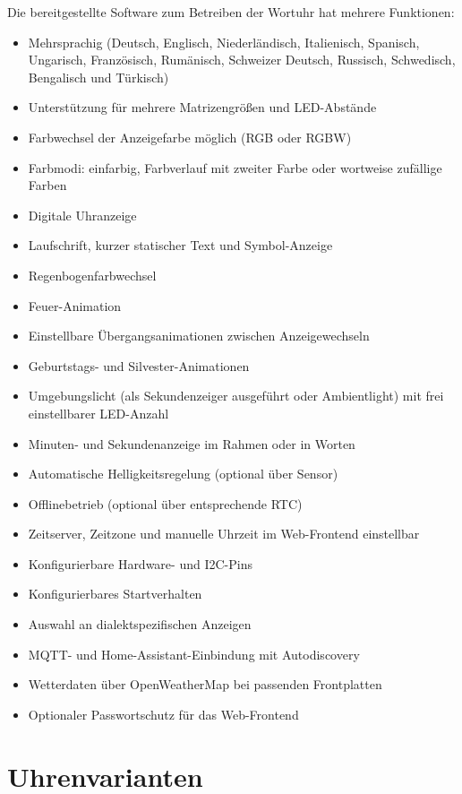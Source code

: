 \documentclass[12pt,a4paper, german,oneside, headinclude, headsepline,plainheadsepline,BCOR20mm, DIV18,parskip=half, openright, numbers=noenddot, captions=tableheading,version=first,listof=totoc,version=first]{scrbook}
\begin{document}
Die bereitgestellte Software zum Betreiben der Wortuhr hat mehrere Funktionen:

\begin{itemize}
    \item Mehrsprachig (Deutsch, Englisch, Niederländisch, Italienisch, Spanisch, Ungarisch, Französisch, Rumänisch, Schweizer Deutsch, Russisch, Schwedisch, Bengalisch und Türkisch)
    \item Unterstützung für mehrere Matrizengrößen und LED-Abstände
    \item Farbwechsel der Anzeigefarbe möglich (RGB oder RGBW)
    \item Farbmodi: einfarbig, Farbverlauf mit zweiter Farbe oder wortweise zufällige Farben
    \item Digitale Uhranzeige
    \item Laufschrift, kurzer statischer Text und Symbol-Anzeige
    \item Regenbogenfarbwechsel
    \item Feuer-Animation
    \item Einstellbare Übergangsanimationen zwischen Anzeigewechseln
    \item Geburtstags- und Silvester-Animationen
    \item Umgebungslicht (als Sekundenzeiger ausgeführt oder Ambientlight) mit frei einstellbarer LED-Anzahl
    \item Minuten- und Sekundenanzeige im Rahmen oder in Worten
    \item Automatische Helligkeitsregelung (optional über Sensor)
    \item Offlinebetrieb (optional über entsprechende RTC)
    \item Zeitserver, Zeitzone und manuelle Uhrzeit im Web-Frontend einstellbar
    \item Konfigurierbare Hardware- und I2C-Pins
    \item Konfigurierbares Startverhalten
    \item Auswahl an dialektspezifischen Anzeigen
    \item MQTT- und Home-Assistant-Einbindung mit Autodiscovery
    \item Wetterdaten über OpenWeatherMap bei passenden Frontplatten
    \item Optionaler Passwortschutz für das Web-Frontend
\end{itemize}

\section{Uhrenvarianten}
\end{document}
